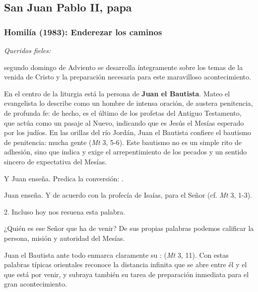 \subsection{San Juan Pablo II, papa}

\subsubsection{Homilía (1983): Enderezar los caminos} 


\begin{body}
	\emph{Queridos fieles:} 
	
	 segundo domingo de Adviento se desarrolla íntegramente sobre los temas de la venida de Cristo y la preparación necesaria para este maravilloso acontecimiento. 
	
	En el centro de la liturgia está la persona de \textbf{Juan el Bautista}. Mateo el evangelista lo describe como un hombre de intensa oración, de austera penitencia, de profunda fe: de hecho, es el último de los profetas del Antiguo Testamento, que actúa como un pasaje al Nuevo, indicando que es Jesús el Mesías esperado por los judíos. En las orillas del río Jordán, Juan el Bautista confiere el bautismo de penitencia: mucha gente  (\emph{Mt} 3, 5-6). Este bautismo no es un simple rito de adhesión, sino que indica y exige el arrepentimiento de los pecados y un sentido sincero de expectativa del Mesías. 
	
	Y Juan enseña. Predica la conversión: . 
	
	Juan enseña. Y de acuerdo con la profecía de Isaías,  para el Señor (cf. \emph{Mt} 3, 1-3). 
	
	2. Incluso hoy nos resuena esta palabra. 
	
	¿Quién es ese Señor que ha de venir? De sus propias palabras podemos calificar la persona, misión y autoridad del Mesías. 
	
	Juan el Bautista ante todo enmarca claramente su :  (\emph{Mt} 3, 11). Con estas palabras típicas orientales reconoce la distancia infinita que se abre entre él y el que está por venir, y subraya también su tarea de preparación inmediata para el gran acontecimiento. 
	

\end{body}

